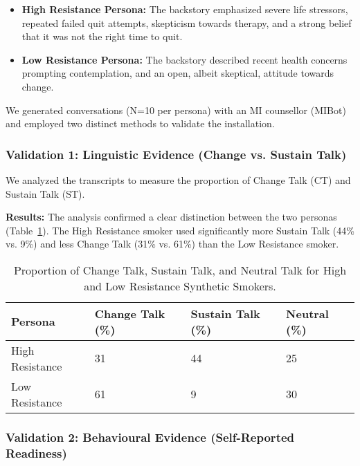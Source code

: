 \begin{itemize}
    \item \textbf{High Resistance Persona:} The backstory emphasized severe life stressors, repeated failed quit attempts, skepticism towards therapy, and a strong belief that it was not the right time to quit.
    \item \textbf{Low Resistance Persona:} The backstory described recent health concerns prompting contemplation, and an open, albeit skeptical, attitude towards change.
\end{itemize}

We generated conversations (N=10 per persona) with an MI counsellor (MIBot) and employed two distinct methods to validate the installation.

\subsubsection{Validation 1: Linguistic Evidence (Change vs. Sustain Talk)}

We analyzed the transcripts to measure the proportion of Change Talk (CT) and Sustain Talk (ST).

\textbf{Results:} The analysis confirmed a clear distinction between the two personas (Table~\ref{tab:resistance-ct-st}). The High Resistance smoker used significantly more Sustain Talk (44\% vs. 9\%) and less Change Talk (31\% vs. 61\%) than the Low Resistance smoker.

\begin{table}[h!]
\centering
\caption{Proportion of Change Talk, Sustain Talk, and Neutral Talk for High and Low Resistance Synthetic Smokers.}
\label{tab:resistance-ct-st}
\begin{tabular}{@{}llll@{}}
\toprule
\textbf{Persona} & \textbf{Change Talk (\%)} & \textbf{Sustain Talk (\%)} & \textbf{Neutral (\%)} \\ \midrule
High Resistance & 31 & 44 & 25 \\
Low Resistance & 61 & 9 & 30 \\ \bottomrule
\end{tabular}
\end{table}

\subsubsection{Validation 2: Behavioural Evidence (Self-Reported Readiness)}

